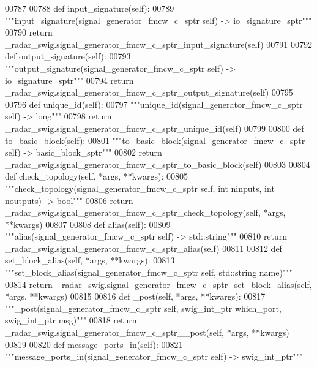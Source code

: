 \begin{DoxyCode}
{{{{00787 
00788     \textcolor{keyword}{def }input_signature(self):
00789         \textcolor{stringliteral}{"""input\_signature(signal\_generator\_fmcw\_c\_sptr self) -> io\_signature\_sptr"""}
00790         \textcolor{keywordflow}{return} \_radar\_swig.signal\_generator\_fmcw\_c\_sptr\_input\_signature(self)
00791 
00792     \textcolor{keyword}{def }output_signature(self):
00793         \textcolor{stringliteral}{"""output\_signature(signal\_generator\_fmcw\_c\_sptr self) -> io\_signature\_sptr"""}
00794         \textcolor{keywordflow}{return} \_radar\_swig.signal\_generator\_fmcw\_c\_sptr\_output\_signature(self)
00795 
00796     \textcolor{keyword}{def }unique_id(self):
00797         \textcolor{stringliteral}{"""unique\_id(signal\_generator\_fmcw\_c\_sptr self) -> long"""}
00798         \textcolor{keywordflow}{return} \_radar\_swig.signal\_generator\_fmcw\_c\_sptr\_unique\_id(self)
00799 
00800     \textcolor{keyword}{def }to_basic_block(self):
00801         \textcolor{stringliteral}{"""to\_basic\_block(signal\_generator\_fmcw\_c\_sptr self) -> basic\_block\_sptr"""}
00802         \textcolor{keywordflow}{return} \_radar\_swig.signal\_generator\_fmcw\_c\_sptr\_to\_basic\_block(self)
00803 
00804     \textcolor{keyword}{def }check_topology(self, *args, **kwargs):
00805         \textcolor{stringliteral}{"""check\_topology(signal\_generator\_fmcw\_c\_sptr self, int ninputs, int noutputs) -> bool"""}
00806         \textcolor{keywordflow}{return} \_radar\_swig.signal\_generator\_fmcw\_c\_sptr\_check\_topology(self, *args, **kwargs)
00807 
00808     \textcolor{keyword}{def }alias(self):
00809         \textcolor{stringliteral}{"""alias(signal\_generator\_fmcw\_c\_sptr self) -> std::string"""}
00810         \textcolor{keywordflow}{return} \_radar\_swig.signal\_generator\_fmcw\_c\_sptr\_alias(self)
00811 
00812     \textcolor{keyword}{def }set_block_alias(self, *args, **kwargs):
00813         \textcolor{stringliteral}{"""set\_block\_alias(signal\_generator\_fmcw\_c\_sptr self, std::string name)"""}
00814         \textcolor{keywordflow}{return} \_radar\_swig.signal\_generator\_fmcw\_c\_sptr\_set\_block\_alias(self, *args, **kwargs)
00815 
00816     \textcolor{keyword}{def }_post(self, *args, **kwargs):
00817         \textcolor{stringliteral}{"""\_post(signal\_generator\_fmcw\_c\_sptr self, swig\_int\_ptr which\_port, swig\_int\_ptr msg)"""}
00818         \textcolor{keywordflow}{return} \_radar\_swig.signal\_generator\_fmcw\_c\_sptr\_\_post(self, *args, **kwargs)
00819 
00820     \textcolor{keyword}{def }message_ports_in(self):
00821         \textcolor{stringliteral}{"""message\_ports\_in(signal\_generator\_fmcw\_c\_sptr self) -> swig\_int\_ptr"""}
}}}}
\end{DoxyCode}
